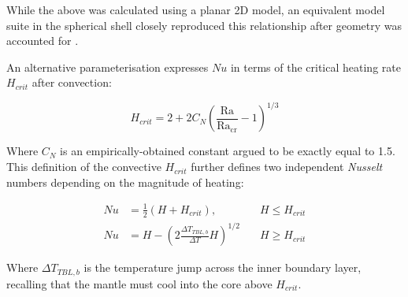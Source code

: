 While the above was calculated using a planar 2D model, an equivalent model suite in the spherical shell closely reproduced this relationship after geometry was accounted for \cite{Weller2016-nm}.

An alternative parameterisation \cite{Vilella2018-il} expresses $Nu$ in terms of the critical heating rate $H_{crit}$ after convection:

\begin{equation}
H_{crit} = 2 + 2 C_N {\left( \frac{\mathrm{Ra}}{{\mathrm{Ra}}_{\mathrm{cr}}} - 1 \right)}^{1/3}
\end{equation}

Where $C_N$ is an empirically-obtained constant argued to be exactly equal to 1.5. This definition of the convective $H_{crit}$ further defines two independent \textit{Nusselt} numbers depending on the magnitude of heating:

\begin{align*}
Nu &= \frac{1}{2} \left( H + H_{crit} \right), \quad &H \le H_{crit} \\
Nu &=  H - {\left( 2 \frac{{\Delta T}_{TBL,b}}{\Delta T} H \right)}^{1/2} \quad &H \ge H_{crit}
\end{align*}

Where ${\Delta T}_{TBL,b}$ is the temperature jump across the inner boundary layer, recalling that the mantle must cool into the core above $H_{crit}$.